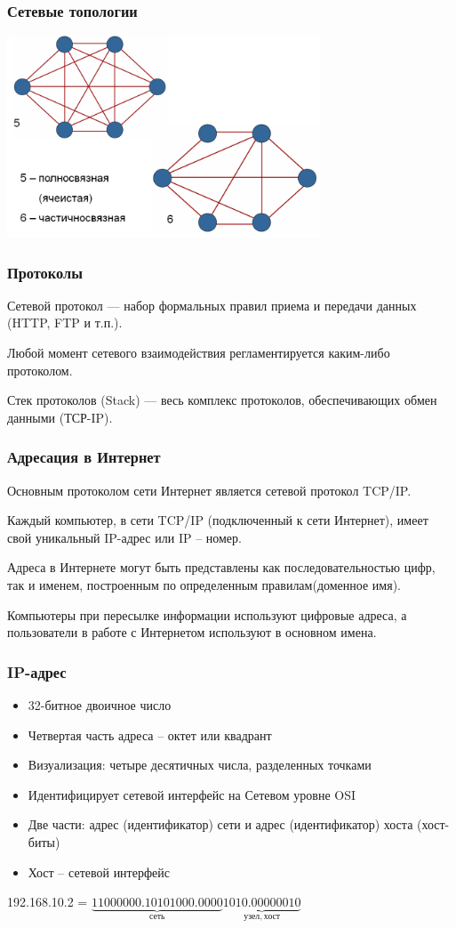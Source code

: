 \begin{frame}[t]
\frametitle{Сетевые топологии }
\includegraphics[height=6cm]{images/it_3}


\end{frame}

\begin{frame}[t]
\frametitle{Протоколы}
Сетевой протокол --- набор формальных правил приема и передачи данных (HTTP, FTP и т.п.).

Любой момент сетевого взаимодействия регламентируется каким-либо протоколом.

Стек протоколов (Stack) --- весь комплекс протоколов, обеспечивающих обмен данными (ТСР-IP). 


\end{frame}

\begin{frame}[t]
\frametitle{Адресация в Интернет}
Основным протоколом сети Интернет является сетевой протокол TCP/IP. 

Каждый компьютер, в сети TCP/IP (подключенный к сети Интернет), имеет свой уникальный IP-адрес или IP – номер. 

Адреса в Интернете могут быть представлены как последовательностью цифр, так и именем, построенным по определенным правилам(доменное имя). 

Компьютеры при пересылке информации используют цифровые адреса, а пользователи в работе с Интернетом используют в основном имена.

\end{frame}

\begin{frame}[t]
\frametitle{IP-адрес}
\begin{itemize}
	\item 32-битное двоичное число
\item Четвертая часть адреса – октет или квадрант
\item Визуализация: четыре десятичных числа, 	разделенных точками
\item Идентифицирует сетевой интерфейс на Сетевом 	уровне OSI
\item Две части: адрес (идентификатор) сети и адрес 	(идентификатор) хоста (хост-биты)
\item Хост – сетевой интерфейс
\end{itemize}

192.168.10.2 = $\underbrace{11000000.10101000.0000}_{сеть}\underbrace{1010.00000010}_{узел, хост}$

\end{frame}

